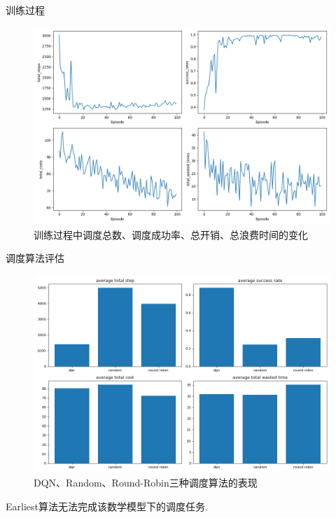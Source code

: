 \begin{frame}{训练过程}

    \begin{figure}
        \centering
        \includegraphics[height=0.7\textheight]{pics/train.png}
        \caption{训练过程中调度总数、调度成功率、总开销、总浪费时间的变化}
    \end{figure}

\end{frame}

\begin{frame}{调度算法评估}

    \begin{figure}
        \centering
        \includegraphics[height=0.7\textheight]{pics/evaluate.png}
        \caption{DQN、Random、Round-Robin三种调度算法的表现}
    \end{figure}

    Earliest算法无法完成该数学模型下的调度任务.

\end{frame}
